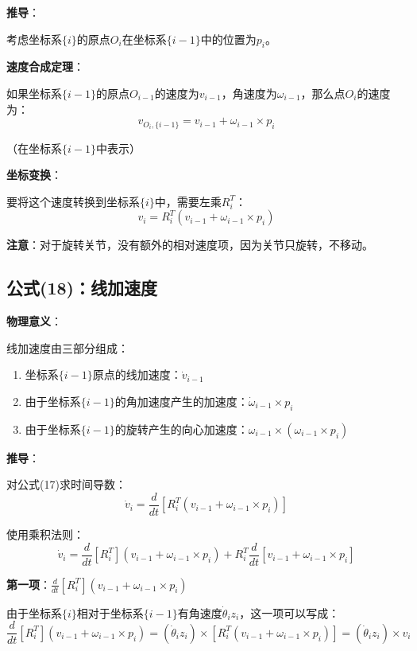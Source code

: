 \documentclass[12pt,a4paper]{article}
\begin{document}
\textbf{推导}：

考虑坐标系$\{i\}$的原点$O_i$在坐标系$\{i-1\}$中的位置为$p_i$。

\textbf{速度合成定理}：

如果坐标系$\{i-1\}$的原点$O_{i-1}$的速度为$v_{i-1}$，角速度为$\omega_{i-1}$，那么点$O_i$的速度为：
\begin{equation}
v_{O_i, \{i-1\}} = v_{i-1} + \omega_{i-1} \times p_i
\end{equation}

（在坐标系$\{i-1\}$中表示）

\textbf{坐标变换}：

要将这个速度转换到坐标系$\{i\}$中，需要左乘$R_i^T$：
\begin{equation}
v_i = R_i^T (v_{i-1} + \omega_{i-1} \times p_i) \tag{17}
\end{equation}

\textbf{注意}：对于旋转关节，没有额外的相对速度项，因为关节只旋转，不移动。

\subsection{公式(18)：线加速度}

\textbf{物理意义}：

线加速度由三部分组成：
\begin{enumerate}
\item 坐标系$\{i-1\}$原点的线加速度：$\dot{v}_{i-1}$
\item 由于坐标系$\{i-1\}$的角加速度产生的加速度：$\dot{\omega}_{i-1} \times p_i$
\item 由于坐标系$\{i-1\}$的旋转产生的向心加速度：$\omega_{i-1} \times (\omega_{i-1} \times p_i)$
\end{enumerate}

\textbf{推导}：

对公式(17)求时间导数：
\begin{equation}
\dot{v}_i = \frac{d}{dt}[R_i^T (v_{i-1} + \omega_{i-1} \times p_i)]
\end{equation}

使用乘积法则：
\begin{equation}
\dot{v}_i = \frac{d}{dt}[R_i^T] (v_{i-1} + \omega_{i-1} \times p_i) + R_i^T \frac{d}{dt}[v_{i-1} + \omega_{i-1} \times p_i]
\end{equation}

\textbf{第一项}：$\frac{d}{dt}[R_i^T] (v_{i-1} + \omega_{i-1} \times p_i)$

由于坐标系$\{i\}$相对于坐标系$\{i-1\}$有角速度$\dot{\theta}_i z_i$，这一项可以写成：
\begin{equation}
\frac{d}{dt}[R_i^T] (v_{i-1} + \omega_{i-1} \times p_i) = (\dot{\theta}_i z_i) \times [R_i^T (v_{i-1} + \omega_{i-1} \times p_i)] = (\dot{\theta}_i z_i) \times v_i
\end{equation}
\end{document}
